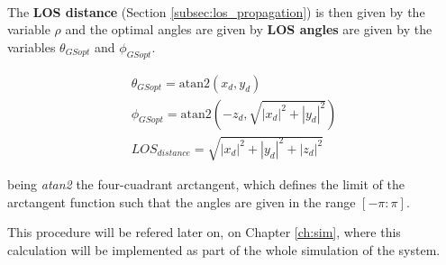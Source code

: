 \paragraph{} The \textbf{LOS distance} (Section \ref{subsec:los_propagation}) is then given by the variable $\rho$ and the optimal angles are given by \textbf{LOS angles} are given by the variables $\theta_{GSopt}$ and $\phi_{GSopt}$.

\begin{align}\label{eq:OptGS}
  \theta_{GSopt} = \text{atan2}\left(x_{d}, y_{d}\right) \nonumber \\
  \phi_{GSopt}=  \text{atan2}\left(-z_{d}, \sqrt{|x_{d}|^{2}+|y_{d}|^{2}}\right) \\
  LOS_{distance} = \sqrt{|x_{d}|^{2}+|y_{d}|^{2}+|z_{d}|^{2}} \nonumber
\end{align}

being \textit{atan2} the four-cuadrant arctangent, which defines the limit of the arctangent function such that the angles are given in the range $[-\pi:\pi]$.

This procedure will be refered later on, on Chapter \ref{ch:sim}, where this calculation will be implemented as part of the whole simulation of the system.

